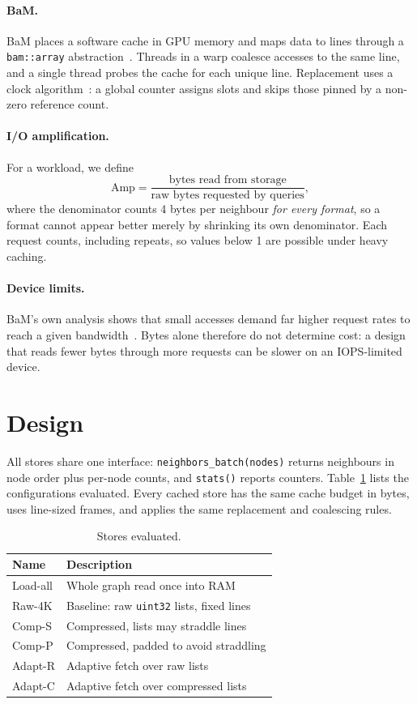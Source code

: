 \documentclass[sigconf,nonacm]{acmart}
\newcommand{\store}[1]{\textsf{#1}}
\begin{document}
\paragraph{BaM.}
BaM places a software cache in GPU memory and maps data to lines through a \texttt{bam::array} abstraction~\cite{bam}. Threads in a
warp coalesce accesses to the same line, and a single thread probes the cache for each unique line. Replacement uses a clock
algorithm~\cite{corbato}: a global counter assigns slots and skips those pinned by a non-zero reference count.

\paragraph{I/O amplification.} For a workload, we define
\begin{equation}
  \mathrm{Amp} = \frac{\text{bytes read from storage}}{\text{raw bytes requested by queries}},
\end{equation}
where the denominator counts 4 bytes per neighbour \emph{for every format}, so a format cannot appear better merely by
shrinking its own denominator. Each request counts, including repeats, so values below 1 are possible under heavy caching.

\paragraph{Device limits.}
BaM's own analysis shows that small accesses demand far higher request rates to reach a given bandwidth~\cite{bam}. Bytes alone therefore do
not determine cost: a design that reads fewer bytes through more requests can be slower on an IOPS-limited device.

\section{Design}
All stores share one interface: \texttt{neighbors\_batch(nodes)} returns neighbours in node order plus per-node counts, and \texttt{stats()} reports
counters. Table~\ref{tab:stores} lists the configurations evaluated. Every cached store has the same cache budget in bytes, uses line-sized frames,
and applies the same replacement and coalescing rules.

\begin{table}[t]
\caption{Stores evaluated.}\label{tab:stores}
\small
\begin{tabular}{@{}ll@{}}
\toprule
Name & Description \\
\midrule
\store{Load-all} & Whole graph read once into RAM \\
\store{Raw-4K} & Baseline: raw \texttt{uint32} lists, fixed lines \\
\store{Comp-S} & Compressed, lists may straddle lines \\
\store{Comp-P} & Compressed, padded to avoid straddling \\
\store{Adapt-R} & Adaptive fetch over raw lists \\
\store{Adapt-C} & Adaptive fetch over compressed lists \\
\bottomrule
\end{tabular}
\end{table}
\end{document}
